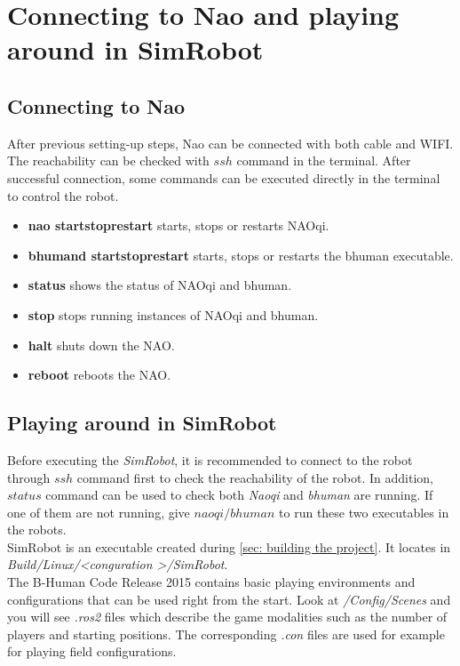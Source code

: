 \documentclass[a4paper]{article}
\begin{document}
\section{Connecting to Nao and playing around in SimRobot}
\subsection{Connecting to Nao}
After previous setting-up steps, Nao can be connected with both cable and WIFI. The reachability can be checked with $ssh$ command in the terminal. After successful connection, some commands can be executed directly in the terminal to control the robot. 
\begin{itemize}
	\item \textbf{nao start\textbar stop\textbar restart} starts, stops or restarts NAOqi.
	\item \textbf{bhumand start\textbar stop\textbar restart} starts, stops or restarts the bhuman executable.
	\item \textbf{status} shows the status of NAOqi and bhuman.
	\item \textbf{stop} stops running instances of NAOqi and bhuman.
	\item \textbf{halt} shuts down the NAO.
	\item \textbf{reboot} reboots the NAO.
\end{itemize}

\subsection{Playing around in SimRobot}
Before executing the \emph{SimRobot}, it is recommended to connect to the robot through $ssh$ command first to check the reachability of the robot. In addition, $status$ command can be used to check both \emph{Naoqi} and \emph{bhuman} are running. If one of them are not running, give $naoqi/bhuman$ to run these two executables in the robots.\\
SimRobot is an executable created during \ref{sec: building the project}. It locates in \textit{Build/Linux/\textless conguration \textgreater /SimRobot}.\\ 
The B-Human Code Release 2015 contains basic playing environments and configurations that can be used right from the start. Look at \textit{/Config/Scenes} and you will see \textit{.ros2} files which describe the game modalities such as the number of players and starting positions. The corresponding \textit{.con} files are used for example for playing field configurations.\\
\end{document}
